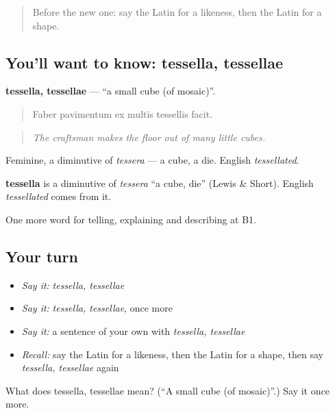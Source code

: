 \begin{quote}
Before the new one: say the Latin for a likeness, then the Latin for a shape.
\end{quote}

\subsection*{You'll want to know: tessella, tessellae}
\textbf{tessella, tessellae} — \textquotedblleft{}a small cube (of mosaic)\textquotedblright{}.

\begin{quote}
Faber pavīmentum ex multīs tessellīs facit.
\end{quote}

\begin{quote}
\emph{The craftsman makes the floor out of many little cubes.}
\end{quote}

Feminine, a diminutive of \emph{tessera} — a cube, a die. English \emph{tessellated}.

\begin{cousinweb}
\textbf{tessella} is a diminutive of \emph{tessera} \textquotedblleft{}a cube, die\textquotedblright{} (Lewis \& Short). English \emph{tessellated} comes from it.
\end{cousinweb}

\begin{grammarlens}[title={What you've built}]
One more word for telling, explaining and describing at B1.
\end{grammarlens}

\subsection*{Your turn}
\begin{itemize}
\raggedright
  \item \emph{Say it:} \emph{tessella, tessellae}
  \item \emph{Say it:} \emph{tessella, tessellae}, once more
  \item \emph{Say it:} a sentence of your own with \emph{tessella, tessellae}
  \item \emph{Recall:} say the Latin for a likeness, then the Latin for a shape, then say \emph{tessella, tessellae} again
\end{itemize}

\begin{tcolorbox}[breakable,colback=teal!4,colframe=teal!35!black,title={Before you move on}]
What does tessella, tessellae mean? (\textquotedblleft{}A small cube (of mosaic)\textquotedblright{}.) Say it once more.
\end{tcolorbox}
